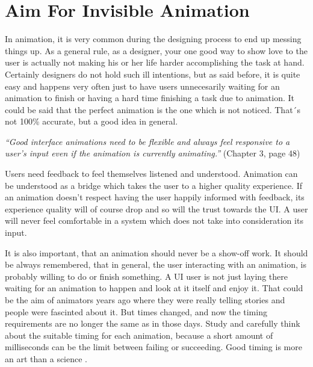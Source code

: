 
\section{Aim For Invisible Animation} %
\label{sec:anime_invisible}

In animation, it is very common during the designing process to end up messing things up. As a general rule, as a designer, your one good way to show love to the user is actually not making his or her life harder accomplishing the task at hand. Certainly designers do not hold such ill intentions, but as said before, it is quite easy and happens very often just to have users unnecesarily waiting for an animation to finish or having a hard time finishing a task due to animation. It could be said that the perfect animation is the one which is not noticed. That´s not 100\% accurate, but a good idea in general. 

\vspace{5mm}

{\em“Good interface animations need to be flexible and always feel responsive to a user’s input even if the animation is currently animating.”}\citet{head2016designing} (Chapter 3, page 48)

\vspace{5mm}

Users need feedback to feel themselves listened and understood. Animation can be understood as a bridge which takes the user to a higher quality experience. If an animation doesn’t respect having the user happily informed with feedback, its experience quality will of course drop and so will the trust towards the UI. A user will never feel comfortable in a system which does not take into consideration its input. 

It is also important, that an animation should never be a show-off work. It should be always remembered, that in general, the user interacting with an animation, is probably willing to do or finish something. A UI user is not just laying there waiting for an animation to happen and look at it itself and enjoy it. That could be the aim of animators years ago where they were really telling stories and people were fascinted about it. But times changed, and now the timing requirements are no longer the same as in those days. Study and carefully think about the suitable timing for each animation, because a short amount of milliseconds can be the limit between failing or succeeding. Good timing is more an art than a science \citep{head2016designing}.

